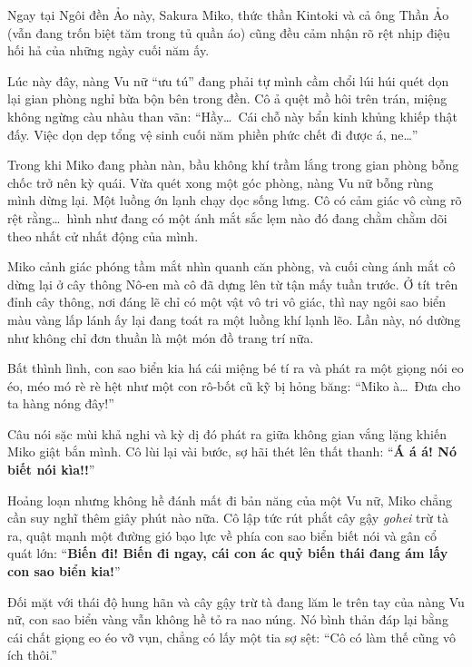\documentclass[../main.tex]{subfiles}
\begin{document}
Ngay tại Ngôi đền Ảo này, Sakura Miko, thức thần Kintoki và cả ông Thần Ảo (vẫn đang trốn biệt tăm trong tủ quần áo) cũng đều cảm nhận rõ rệt nhịp điệu hối hả của những ngày cuối năm ấy.

Lúc này đây, nàng Vu nữ ``ưu tú'' đang phải tự mình cầm chổi lúi húi quét dọn lại gian phòng nghỉ bừa bộn bên trong đền. Cô ả quệt mồ hôi trên trán, miệng không ngừng càu nhàu than vãn: ``Hầy\dots\ Cái chỗ này bẩn kinh khủng khiếp thật đấy. Việc dọn dẹp tổng vệ sinh cuối năm phiền phức chết đi được á, ne\dots''

Trong khi Miko đang phàn nàn, bầu không khí trầm lắng trong gian phòng bỗng chốc trở nên kỳ quái. Vừa quét xong một góc phòng, nàng Vu nữ bỗng rùng mình dừng lại. Một luồng ớn lạnh chạy dọc sống lưng. Cô có cảm giác vô cùng rõ rệt rằng\dots\ hình như đang có một ánh mắt sắc lẹm nào đó đang chằm chằm dõi theo nhất cử nhất động của mình.


Miko cảnh giác phóng tầm mắt nhìn quanh căn phòng, và cuối cùng ánh mắt cô dừng lại ở cây thông Nô-en mà cô đã dựng lên từ tận mấy tuần trước. Ở tít trên đỉnh cây thông, nơi đáng lẽ chỉ có một vật vô tri vô giác, thì nay ngôi sao biển màu vàng lấp lánh ấy lại đang toát ra một luồng khí lạnh lẽo. Lần này, nó dường như không chỉ đơn thuần là một món đồ trang trí nữa.

Bất thình lình, con sao biển kia há cái miệng bé tí ra và phát ra một giọng nói eo éo, méo mó rè rè hệt như một con rô-bốt cũ kỹ bị hỏng băng: ``Miko à\dots\ Đưa cho ta hàng nóng đây!''

Câu nói sặc mùi khả nghi và kỳ dị đó phát ra giữa không gian vắng lặng khiến Miko giật bắn mình. Cô lùi lại vài bước, sợ hãi thét lên thất thanh: ``\textbf{Á á á! Nó biết nói kìa!!}''


Hoảng loạn nhưng không hề đánh mất đi bản năng của một Vu nữ, Miko chẳng cần suy nghĩ thêm giây phút nào nữa. Cô lập tức rút phắt cây gậy \textit{gohei} trừ tà ra, quật mạnh một đường gió bạo lực về phía con sao biển biết nói và gân cổ quát lớn: ``\textbf{Biến đi! Biến đi ngay, cái con ác quỷ biến thái đang ám lấy con sao biển kia!}''

Đối mặt với thái độ hung hãn và cây gậy trừ tà đang lăm le trên tay của nàng Vu nữ, con sao biển vàng vẫn không hề tỏ ra nao núng. Nó bình thản đáp lại bằng cái chất giọng eo éo vỡ vụn, chẳng có lấy một tia sợ sệt: ``Cô có làm thế cũng vô ích thôi.''
\end{document}
